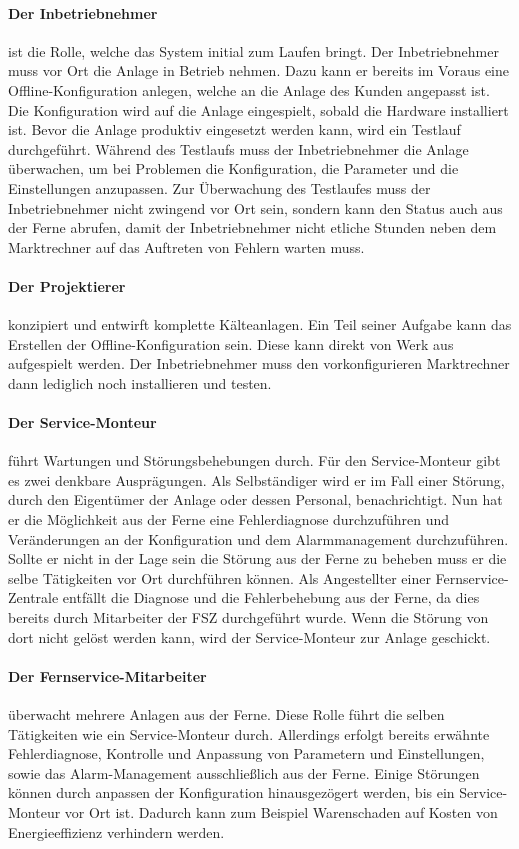 \documentclass[11pt,a4paper]{report}
\begin{document}
\paragraph{Der Inbetriebnehmer} ist die Rolle, welche das System initial zum Laufen bringt. Der Inbetriebnehmer muss vor Ort die Anlage in Betrieb nehmen. Dazu kann er bereits im Voraus eine Offline-Konfiguration anlegen, welche an die Anlage des Kunden angepasst ist. Die Konfiguration wird auf die Anlage eingespielt, sobald die Hardware installiert ist. Bevor die Anlage produktiv eingesetzt werden kann, wird ein Testlauf durchgeführt. Während des Testlaufs muss der Inbetriebnehmer die Anlage überwachen, um bei Problemen die Konfiguration, die Parameter und die Einstellungen anzupassen. Zur Überwachung des Testlaufes muss der Inbetriebnehmer nicht zwingend vor Ort sein, sondern kann den Status auch aus der Ferne abrufen, damit der Inbetriebnehmer nicht etliche Stunden neben dem Marktrechner auf das Auftreten von Fehlern warten muss.

\paragraph{Der Projektierer} konzipiert und entwirft komplette Kälteanlagen. Ein Teil seiner Aufgabe kann das Erstellen der Offline-Konfiguration sein. Diese kann direkt von Werk aus aufgespielt werden. Der Inbetriebnehmer muss den vorkonfigurieren Marktrechner dann lediglich noch installieren und testen.

\paragraph{Der Service-Monteur} führt Wartungen und Störungsbehebungen durch. Für den Service-Monteur gibt es zwei denkbare Ausprägungen. Als Selbständiger wird er im Fall einer Störung, durch den Eigentümer der Anlage oder dessen Personal, benachrichtigt. Nun hat er die Möglichkeit aus der Ferne eine Fehlerdiagnose durchzuführen und Veränderungen an der Konfiguration und dem Alarmmanagement durchzuführen. Sollte er nicht in der Lage sein die Störung aus der Ferne zu beheben muss er die selbe Tätigkeiten vor Ort durchführen können. Als Angestellter einer Fernservice-Zentrale entfällt die Diagnose und die Fehlerbehebung aus der Ferne, da dies bereits durch Mitarbeiter der FSZ durchgeführt wurde. Wenn die Störung von dort nicht gelöst werden kann, wird der Service-Monteur zur Anlage geschickt.

\paragraph{Der Fernservice-Mitarbeiter} überwacht mehrere Anlagen aus der Ferne. Diese Rolle führt die selben Tätigkeiten wie ein Service-Monteur durch. Allerdings erfolgt bereits erwähnte Fehlerdiagnose, Kontrolle und Anpassung von Parametern und Einstellungen, sowie das Alarm-Management ausschließlich aus der Ferne. Einige Störungen können durch anpassen der Konfiguration hinausgezögert werden, bis ein Service-Monteur vor Ort ist. Dadurch kann zum Beispiel Warenschaden auf Kosten von Energieeffizienz verhindern werden.
\end{document}
